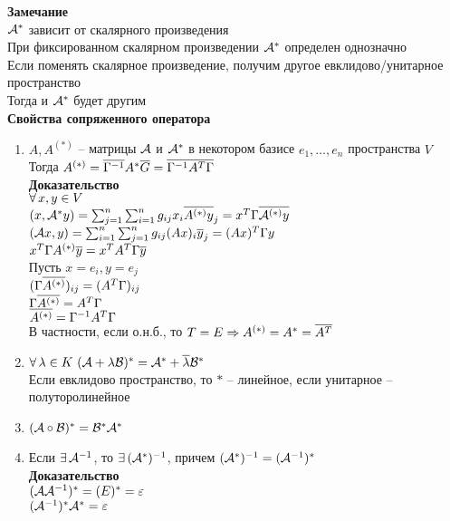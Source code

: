 \documentclass[12pt]{article}
\begin{document}
\textbf{Замечание}\\
$\mathcal{A}^*$ зависит от скалярного произведения\\
При фиксированном скалярном произведении $\mathcal{A}^*$ определен однозначно\\
Если поменять скалярное произведение, получим другое евклидово/унитарное пространство\\
Тогда и $\mathcal{A}^*$ будет другим\\
\textbf{Свойства сопряженного оператора}
\begin{enumerate}
    \item $A, A^{(*)}$ -- матрицы $\mathcal{A}$ и $\mathcal{A}^*$ в некотором базисе $e_1, \ldots, e_n$ пространства $V$\\
        Тогда $A^{(*)} = \overline {\Gamma^{-1}} A^* \overline G = \overline{\Gamma^{-1} A^T \Gamma}$\\
        \textbf{Доказательство}\\
        $\forall\, x, y \in V$\\
        $(x, \mathcal{A}^* y) = \sum_{j=1}^n \sum_{i=1}^n g_{ij} x_i \overline{A^{(*)} y}_j = x^T \Gamma \overline{\mathcal{A}^{(*)} y}$\\
        $(\mathcal{A} x, y) = \sum_{i=1}^n \sum_{j=1}^n g_{ij} (A x)_i \overline{y}_j = (A x)^T \Gamma y $\\
        $x^T \Gamma A^{(*)} \overline y = x^T A^T \Gamma \overline y $\\
        Пусть $x = e_i, y = e_j$\\
        $( \Gamma \overline{A^{(*)}})_{ij} = (A^T \Gamma)_{ij} $\\
        $ \Gamma \overline{A^{(*)}} = A^T \Gamma $\\
        $ \overline{A^{(*)}} = \Gamma^{-1}A^T \Gamma $\\
        В частности, если о.н.б., то $T = E \Rightarrow A^{(*)} = A^* = \overline{A^T} $
    \item $\forall\, \lambda \in K\ (\mathcal{A} + \lambda\mathcal{B})^* = \mathcal{A}^* + \overline \lambda \mathcal{B}^* $\\
        Если евклидово пространство, то $*$ -- линейное, если унитарное -- полуторолинейное
    \item $(\mathcal{A} \circ \mathcal{B})^* = \mathcal{B}^* \mathcal{A}^*$\\
    \item Если $\exists\, \mathcal{A}^{-1}$, то $\exists\, (\mathcal{A}^*)^{-1}$, причем $(\mathcal{A}^*)^{-1} = (\mathcal{A}^{-1})^* $\\
        \textbf{Доказательство}\\
        $(\mathcal{A} \mathcal{A}^{-1})^* = (E)^* = \varepsilon $\\
        $(\mathcal{A}^{-1})^* \mathcal{A}^* = \varepsilon $\\

\end{enumerate}
\end{document}
